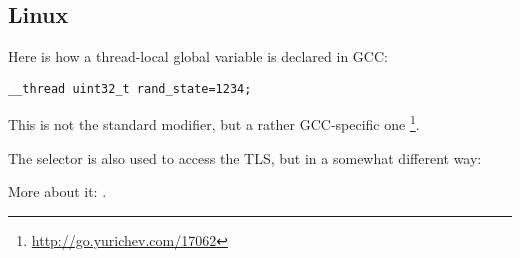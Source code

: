 \subsection{Linux}

Here is how a thread-local global variable is declared in GCC:

\begin{lstlisting}
__thread uint32_t rand_state=1234;
\end{lstlisting}

This is not the standard \CCpp modifier, but a rather GCC-specific one
\footnote{\url{http://go.yurichev.com/17062}}.


The  selector is also used to access the \ac{TLS}, but in a somewhat different way:




More about it: \cite{DrepperTLS}.

